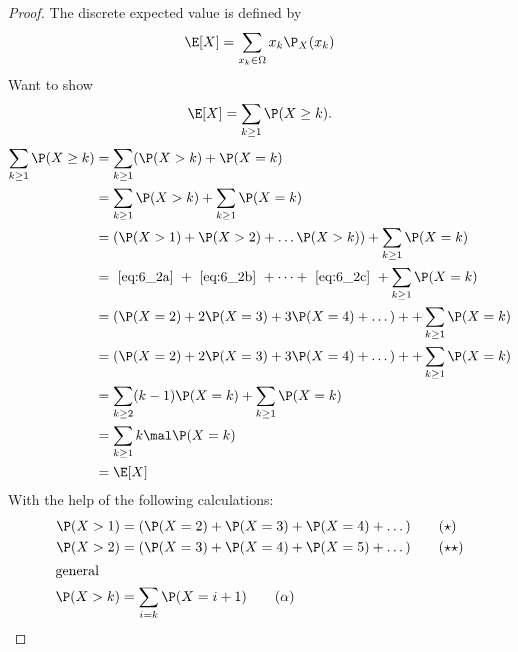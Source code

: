 \subsection{}
\begin{proof}
	The discrete expected value is defined by
	\begin{align*}
		\E[X] = \sum_{x_k \in \O} x_k \P_X(x_k)
	\end{align*}
	Want to show
	\begin{align*}
		\E[X] = \sum_{k \ge 1} \P(X\ge k).
	\end{align*}
	\begin{align*}
		\sum_{k \ge 1} \P(X\ge k) &= \sum_{k \ge 1} (\P(X > k) + \P(X=k)\\
		&= \sum_{k \ge 1} \P(X>k) + \sum_{k \ge 1} \P(X=k)\\
		&= (\P(X>1) + \P(X>2) + \dots \P(X>k)) + \sum_{k\ge 1} \P(X=k)\\
		&= \text{ \ref{eq:6_2a} } + \text{ \ref{eq:6_2b} } + \dots + \text{ \ref{eq:6_2c} } +\sum_{k\ge 1} \P(X=k)\\
		&= (\P(X=2) + 2\P(X=3) + 3\P(X=4) + \dots) + + \sum_{k\ge 1} \P(X=k)\\
		&= (\P(X=2) + 2\P(X=3) + 3\P(X=4) + \dots ) + + \sum_{k\ge 1} \P(X=k)\\
		&= \sum_{k\ge 2} (k-1)\P(X=k) +\sum_{k\ge 1} \P(X=k)\\
		&= \sum_{k\ge 1} k\mal\P(X=k)\\
		&= \E[X]
	\end{align*}
	With the help of the following calculations:
	\begin{align*}
		\P(X>1) &=(\P(X=2) + \P(X=3) + \P(X=4) + \dots)\tag{$\star$}\label{eq:6_2a}\\
		\P(X>2) &=(\P(X=3) + \P(X=4) + \P(X=5) + \dots)\tag{$\star\star$}\label{eq:6_2b}\\
		\intertext{general}
		\P(X>k) &= \sum_{i=k} \P(X=i+1) \label{eq:6_2c}\tag{$\alpha$}
	\end{align*}
\end{proof}
